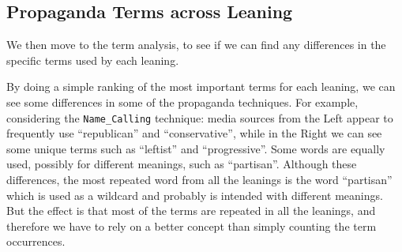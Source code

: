 \subsection{Propaganda Terms across Leaning}
We then move to the term analysis, to see if we can find any differences in the specific terms used by each leaning.




By doing a simple ranking of the most important terms for each leaning, we can see some differences in some of the propaganda techniques. For example, considering the \texttt{Name\_Calling} technique:
media sources from the Left appear to frequently use ``republican'' and ``conservative'', while in the Right we can see some unique terms such as ``leftist'' and ``progressive''. Some words are equally used, possibly for different meanings, such as ``partisan''.  
Although these differences, the most repeated word from all the leanings is the word ``partisan'' which is used as a wildcard and probably is intended with different meanings.
But the effect is that most of the terms are repeated in all the leanings, and therefore we have to rely on a better concept than simply counting the term occurrences.

